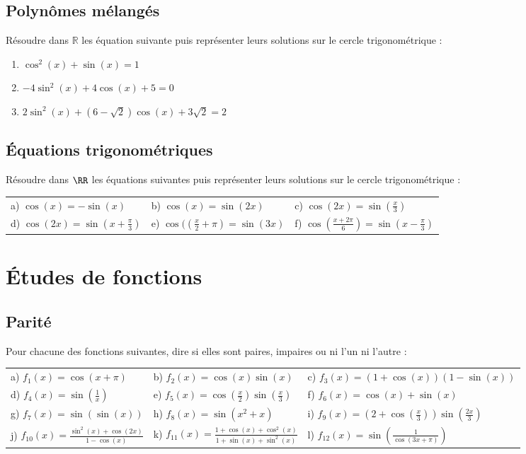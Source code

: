 \documentclass[oneside,12pt]{book}          %
\begin{document}
\subsection{Polynômes mélangés}
Résoudre dans $ \mathbb{R} $ les équation suivante puis représenter leurs solutions sur le cercle trigonométrique :
\begin{enumerate}
    \item $ \cos^2(x) + \sin(x) = 1 $
    \item $-4\sin^2(x)+4\cos(x)+5=0$
    \item $ 2\sin^2(x)+(6-\sqrt{2})\cos(x)+3\sqrt{2}=2$
\end{enumerate}



\subsection{Équations trigonométriques}
 Résoudre dans $\RR$ les équations suivantes puis représenter leurs solutions sur le cercle trigonométrique :

\begin{tabular}{p{} p{} p{}}

    a) $\cos(x)=-\sin(x)$ & b) $\cos(x)=\sin(2x)$ & c) $\cos(2x)=\sin(\frac{x}{3})$ \\
    d) $\cos(2x)=\sin(x+\frac{\pi}{3})$ & e) $\cos(\left(\frac{x}{2}+\pi\right)=\sin(3x)$ & f) $\cos\left(\frac{x+2\pi}{6}\right)=\sin\left(x-\frac{\pi}{3}\right)$
\end{tabular}



\section{Études de fonctions}

\subsection{Parité}
Pour chacune des fonctions suivantes, dire si elles sont paires, impaires ou ni l'un ni l'autre :

\begin{tabular}{p{} p{} p{}}
     a) $f_1(x)=\cos(x+\pi)$ & b) $f_2(x)=\cos(x)\sin(x)$ & c) $f_3(x)=(1+\cos(x))(1-\sin(x))$ \\
     d) $f_4(x)=\sin(\frac{1}{x})$ & e) $f_5(x)=\cos(\frac{x}{2})\sin(\frac{x}{3})$ & f) $f_6(x)=\cos(x)+\sin(x)$ \\
     g) $f_7(x)=\sin(\sin(x))$ & h) $f_8(x)=\sin(x^2+x)$ & i) $f_9(x)=\left(2+\cos\left(\frac{x}{3}\right)\right)\sin\left(\frac{2x}{3}\right)$ \\
     j) $f_{10}(x)=\frac{\sin^2(x)+\cos(2x)}{1-\cos(x)}$ & k) $f_{11}(x)=\frac{1+\cos(x)+\cos^2(x)}{1+\sin(x)+\sin^2(x)}$ & l) $f_{12}(x)=\sin\left(\frac{1}{\cos(3x+\pi)}\right)$
\end{tabular}
\end{document}
